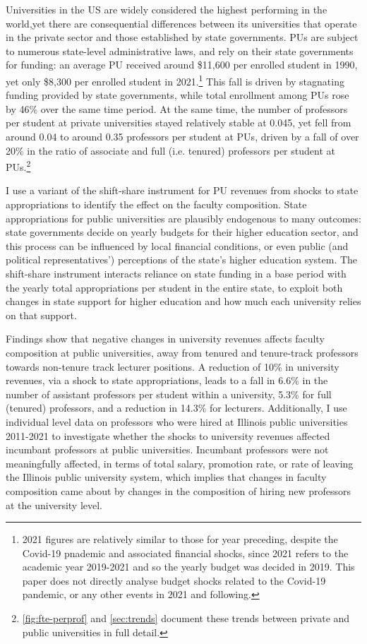 \documentclass[notitlepage,12pt]{article}
\begin{document}
Universities in the US are widely considered the highest performing in the world,yet there are consequential differences between its universities that operate in the private sector and those established by state governments.
PUs are subject to numerous state-level administrative laws, and rely on their state governments for funding: an average PU received around \$11,600 per enrolled student in 1990, yet only \$8,300 per enrolled student in 2021.\footnote{
    2021 figures are relatively similar to those for year preceding, despite the Covid-19 pnademic and associated financial shocks, since 2021 refers to the academic year 2019-2021 and so the yearly budget was decided in 2019.
    This paper does not directly analyse budget shocks related to the Covid-19 pandemic, or any other events in 2021 and following.
}
This fall is driven by stagnating funding provided by state governments, while total enrollment among PUs rose by 46\% over the same time period.
At the same time, the number of professors per student at private universities stayed relatively stable at 0.045, yet fell from around 0.04 to around 0.35 professors per student at PUs, driven by a fall of over 20\% in the ratio of associate and full (i.e. tenured) professors per student at PUs.\footnote{
    \autoref{fig:fte-perprof} and \autoref{sec:trends} document these trends between private and public universities in full detail.
}

I use a variant of the \cite{NBERw23736,NBERw27885} shift-share instrument for PU revenues from shocks to state appropriations to identify the effect on the faculty composition.
State appropriations for public universities are plausibly endogenous to many outcomes: state governments decide on yearly budgets for their higher education sector, and this process can be influenced by local financial conditions, or even public (and political representatives') perceptions of the state's higher education system.
The shift-share instrument interacts reliance on state funding in a base period with the yearly total appropriations per student in the entire state, to exploit both changes in state support for higher education and how much each university relies on that support.

Findings show that negative changes in university revenues affects faculty composition at public universities, away from tenured and tenure-track professors towards non-tenure track lecturer positions.
A reduction of 10\% in university revenues, via a shock to state appropriations, leads to a fall in 6.6\% in the number of assistant professors per student within a university, 5.3\% for full (tenured) professors, and a reduction in 14.3\% for lecturers.
Additionally, I use individual level data on professors who were hired at Illinois public universities 2011-2021 to investigate whether the shocks to university revenues affected incumbant professors at public universities.
Incumbant professors were not meaningfully affected, in terms of total salary, promotion rate, or rate of leaving the Illinois public university system, which implies that changes in faculty composition came about by changes in the composition of hiring new professors at the university level.
\end{document}
